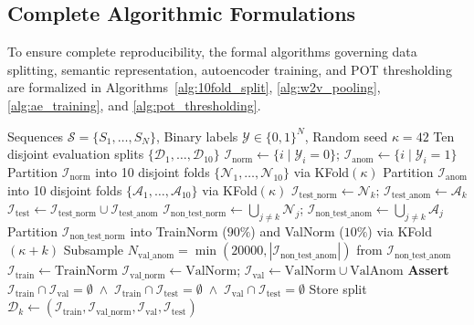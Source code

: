\subsection{Complete Algorithmic Formulations}
\label{subsec:pseudo_code_algorithms}
To ensure complete reproducibility, the formal algorithms governing data splitting, semantic representation, autoencoder training, and POT thresholding are formalized in Algorithms~\ref{alg:10fold_split}, \ref{alg:w2v_pooling}, \ref{alg:ae_training}, and \ref{alg:pot_thresholding}.

\begin{algorithm}[H]
\caption{Strictly Leak-Free 10-Fold Stratification Protocol}
\label{alg:10fold_split}
\begin{algorithmic}[1]
\Require Sequences $\mathcal{S} = \{S_1, \dots, S_N\}$, Binary labels $\mathcal{Y} \in \{0, 1\}^N$, Random seed $\kappa = 42$
\Ensure Ten disjoint evaluation splits $\{\mathcal{D}_1, \dots, \mathcal{D}_{10}\}$
\State $\mathcal{I}_{\text{norm}} \gets \{i \mid \mathcal{Y}_i = 0\}$; $\mathcal{I}_{\text{anom}} \gets \{i \mid \mathcal{Y}_i = 1\}$
\State Partition $\mathcal{I}_{\text{norm}}$ into 10 disjoint folds $\{\mathcal{N}_1, \dots, \mathcal{N}_{10}\}$ via KFold$(\kappa)$
\State Partition $\mathcal{I}_{\text{anom}}$ into 10 disjoint folds $\{\mathcal{A}_1, \dots, \mathcal{A}_{10}\}$ via KFold$(\kappa)$
    \State $\mathcal{I}_{\text{test\_norm}} \gets \mathcal{N}_k$; $\mathcal{I}_{\text{test\_anom}} \gets \mathcal{A}_k$
    \State $\mathcal{I}_{\text{test}} \gets \mathcal{I}_{\text{test\_norm}} \cup \mathcal{I}_{\text{test\_anom}}$ 
    \State $\mathcal{I}_{\text{non\_test\_norm}} \gets \bigcup_{j \ne k} \mathcal{N}_j$; $\mathcal{I}_{\text{non\_test\_anom}} \gets \bigcup_{j \ne k} \mathcal{A}_j$
    \State Partition $\mathcal{I}_{\text{non\_test\_norm}}$ into TrainNorm ($90\%$) and ValNorm ($10\%$) via KFold$(\kappa + k)$
    \State Subsample $N_{\text{val\_anom}} = \min(20000, |\mathcal{I}_{\text{non\_test\_anom}}|)$ from $\mathcal{I}_{\text{non\_test\_anom}}$
    \State $\mathcal{I}_{\text{train}} \gets \text{TrainNorm}$ 
    \State $\mathcal{I}_{\text{val\_norm}} \gets \text{ValNorm}$; $\mathcal{I}_{\text{val}} \gets \text{ValNorm} \cup \text{ValAnom}$
    \State \textbf{Assert} $\mathcal{I}_{\text{train}} \cap \mathcal{I}_{\text{val}} = \emptyset \;\land\; \mathcal{I}_{\text{train}} \cap \mathcal{I}_{\text{test}} = \emptyset \;\land\; \mathcal{I}_{\text{val}} \cap \mathcal{I}_{\text{test}} = \emptyset$
    \State Store split $\mathcal{D}_k \gets (\mathcal{I}_{\text{train}}, \mathcal{I}_{\text{val\_norm}}, \mathcal{I}_{\text{val}}, \mathcal{I}_{\text{test}})$
\EndFor
\end{algorithmic}
\end{algorithm}

